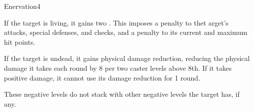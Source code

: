 \begin{spellsection}{Enervation}{4}
\begin{spellheader}
\end{spellheader}
\begin{spellcontent}
    \begin{spelltargetinginfo}
    \end{spelltargetinginfo}
    \begin{spelleffects}
        \spellsuccess If the target is living, it gains two . This imposes a  penalty to thet arget's attacks, special defenses, and checks, and a  penalty to its current and maximum hit points.

        If the target is undead, it gains physical damage reduction, reducing the physical damage it takes each round by 8  per two caster levels above 8th. If it takes positive damage, it cannot use its damage reduction for 1 round.
    \end{spelleffects}
\end{spellcontent}
\begin{spellfooter}
    \spellnotes These negative levels do not stack with other negative levels the target has, if any.
\end{spellfooter}
\end{spellsection}

